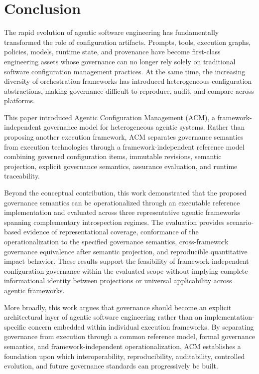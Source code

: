 \documentclass[10pt]{article}
\begin{document}
\section{Conclusion}
\label{sec:conclusion}

The rapid evolution of agentic software engineering has fundamentally transformed the role of configuration artifacts. Prompts, tools, execution graphs, policies, models, runtime state, and provenance have become first-class engineering assets whose governance can no longer rely solely on traditional software configuration management practices. At the same time, the increasing diversity of orchestration frameworks has introduced heterogeneous configuration abstractions, making governance difficult to reproduce, audit, and compare across platforms.

This paper introduced Agentic Configuration Management (ACM), a framework-independent governance model for heterogeneous agentic systems. Rather than proposing another execution framework, ACM separates governance semantics from execution technologies through a framework-independent reference model combining governed configuration items, immutable revisions, semantic projection, explicit governance semantics, assurance evaluation, and runtime traceability.

Beyond the conceptual contribution, this work demonstrated that the proposed governance semantics can be operationalized through an executable reference implementation and evaluated across three representative agentic frameworks spanning complementary introspection regimes. The evaluation provides scenario-based evidence of representational coverage, conformance of the operationalization to the specified governance semantics, cross-framework governance equivalence after semantic projection, and reproducible quantitative impact behavior. These results support the feasibility of framework-independent configuration governance within the evaluated scope without implying complete informational identity between projections or universal applicability across agentic frameworks.

More broadly, this work argues that governance should become an explicit architectural layer of agentic software engineering rather than an implementation-specific concern embedded within individual execution frameworks. By separating governance from execution through a common reference model, formal governance semantics, and framework-independent operationalization, ACM establishes a foundation upon which interoperability, reproducibility, auditability, controlled evolution, and future governance standards can progressively be built.
\end{document}
